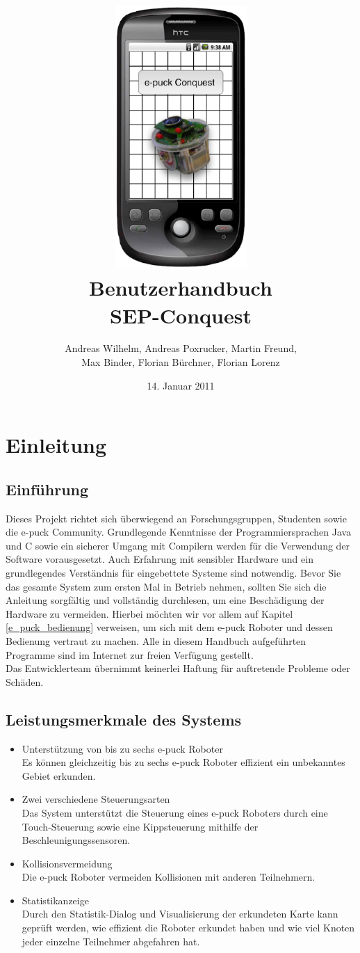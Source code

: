 \documentclass[10pt,a4paper]{article}
\title{
	\includegraphics[height=10cm]{images/logo.eps} \\
	\vspace{1cm}
	Benutzerhandbuch \\
	SEP-Conquest
}
\author{Andreas Wilhelm, Andreas Poxrucker, Martin Freund,\\ Max Binder, Florian B\"urchner, Florian Lorenz}
\let\oldsection\section
\renewcommand{\section}{\newpage \oldsection}
\begin{document}
\date{14. Januar 2011}
	\maketitle
	\newpage
	\tableofcontents	
	\newpage
\section{Einleitung}
	\subsection{Einf\"uhrung}
		Dieses Projekt richtet sich \"uberwiegend an Forschungsgruppen, Studenten sowie die e-puck Community. Grundlegende Kenntnisse der Programmiersprachen 
		Java und C sowie ein sicherer Umgang mit Compilern werden f\"ur die Verwendung der Software vorausgesetzt. Auch Erfahrung mit sensibler 
		Hardware und ein grundlegendes Verst\"andnis f\"ur eingebettete Systeme sind notwendig. Bevor Sie das gesamte System zum ersten Mal in Betrieb 
		nehmen, sollten Sie sich  die Anleitung sorgf\"altig und vollst\"andig durchlesen, um eine Besch\"adigung der Hardware zu vermeiden. Hierbei m\"ochten wir vor allem auf
		Kapitel \ref{e_puck_bedienung} verweisen, um sich mit dem e-puck Roboter und dessen Bedienung vertraut zu machen. Alle in diesem Handbuch  
		aufgef\"uhrten Programme	sind im Internet zur freien Verf\"ugung gestellt.\\ 
		Das Entwicklerteam \"ubernimmt keinerlei Haftung f\"ur auftretende Probleme oder Sch\"aden. \\ 
	\subsection{Leistungsmerkmale des Systems}
		\begin{itemize}
			\item{Unterst\"utzung von bis zu sechs e-puck Roboter} \\		
				Es k\"onnen gleichzeitig bis zu sechs e-puck Roboter effizient ein unbekanntes Gebiet erkunden.
			\item{Zwei verschiedene Steuerungsarten} \\
				Das System unterst\"utzt die Steuerung eines e-puck Roboters durch eine Touch-Steuerung sowie eine Kippsteuerung mithilfe der Beschleunigungssensoren.
			\item{Kollisionsvermeidung} \\
				Die e-puck Roboter vermeiden Kollisionen mit anderen Teilnehmern.
			\item{Statistikanzeige} \\
				Durch den Statistik-Dialog und Visualisierung der erkundeten Karte kann gepr\"uft werden, wie effizient die Roboter erkundet haben und wie viel Knoten jeder
				einzelne Teilnehmer abgefahren hat.
		\end{itemize}		
\end{document}
